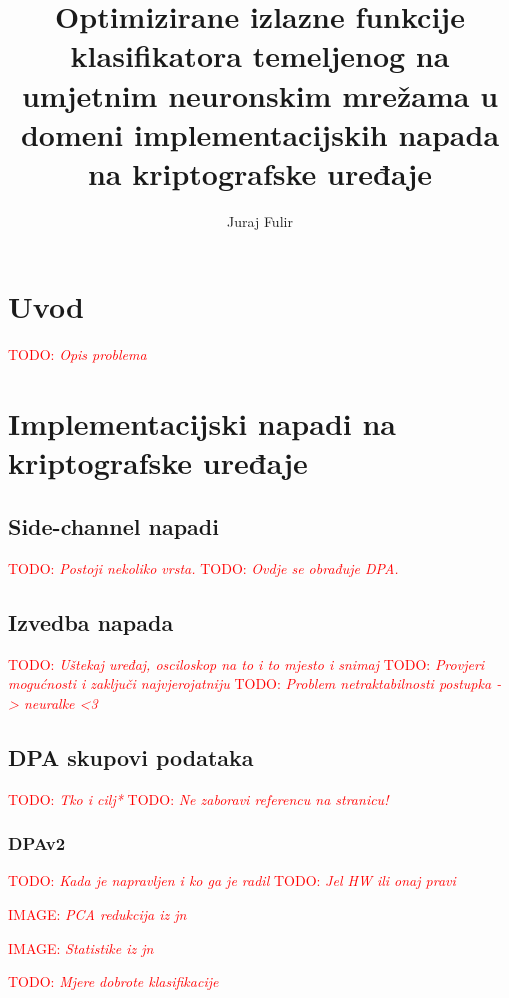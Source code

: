 \documentclass[times, utf8, diplomski]{fer}
\def\TODO#1{\noindent\textcolor{red}{TODO: \textit{#1}}\newline}
\def\todo#1{\TODO{#1}}
\def\todoimg#1{\begin{center} \textcolor{red}{IMAGE: \textit{#1}} \end{center}}
\begin{document}

\title{Optimizirane izlazne funkcije klasifikatora temeljenog na umjetnim neuronskim mrežama u domeni implementacijskih napada na kriptografske uređaje}

\author{Juraj Fulir}

\maketitle

\izvornik


\tableofcontents

\chapter{Uvod}
\todo{ Opis problema }

\chapter{Implementacijski napadi na kriptografske uređaje}

\section{Side-channel napadi}
\todo{ Postoji nekoliko vrsta.}
\todo{ Ovdje se obrađuje DPA.}

\section{Izvedba napada}
\todo{ Uštekaj uređaj, osciloskop na to i to mjesto i snimaj}
\todo{ Provjeri mogućnosti i zaključi najvjerojatniju}
\todo{ Problem netraktabilnosti postupka -> neuralke <3}

\section{DPA skupovi podataka}
\todo{Tko i cilj*}
\todo{Ne zaboravi referencu na stranicu!}

\subsection{DPAv2}
\todo{Kada je napravljen i ko ga je radil}
\todo{Jel HW ili onaj pravi}
\todoimg{PCA redukcija iz jn}
\todoimg{Statistike iz jn}
\todo{Mjere dobrote klasifikacije}
\end{document}
